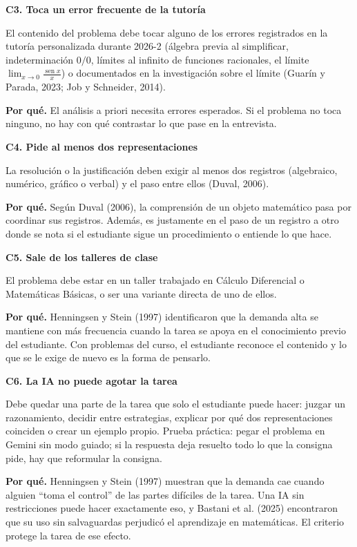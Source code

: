 \documentclass[11pt,letterpaper]{article}
\DeclareMathOperator{\seno}{sen}
\newenvironment{caja}[1]{\par\medskip\noindent\textbf{#1}\par\smallskip\noindent\ignorespaces}{\par\medskip}
\begin{document}
\begin{caja}{C3. Toca un error frecuente de la tutoría}
El contenido del problema debe tocar alguno de los errores registrados en la tutoría personalizada durante 2026-2 (álgebra previa al simplificar, indeterminación $0/0$, límites al infinito de funciones racionales, el límite $\lim_{x\to 0}\frac{\seno x}{x}$) o documentados en la investigación sobre el límite (Guarín y Parada, 2023; Job y Schneider, 2014).

\textbf{Por qué.} El análisis a priori necesita errores esperados. Si el problema no toca ninguno, no hay con qué contrastar lo que pase en la entrevista.
\end{caja}

\begin{caja}{C4. Pide al menos dos representaciones}
La resolución o la justificación deben exigir al menos dos registros (algebraico, numérico, gráfico o verbal) y el paso entre ellos (Duval, 2006).

\textbf{Por qué.} Según Duval (2006), la comprensión de un objeto matemático pasa por coordinar sus registros. Además, es justamente en el paso de un registro a otro donde se nota si el estudiante sigue un procedimiento o entiende lo que hace.
\end{caja}

\begin{caja}{C5. Sale de los talleres de clase}
El problema debe estar en un taller trabajado en Cálculo Diferencial o Matemáticas Básicas, o ser una variante directa de uno de ellos.

\textbf{Por qué.} Henningsen y Stein (1997) identificaron que la demanda alta se mantiene con más frecuencia cuando la tarea se apoya en el conocimiento previo del estudiante. Con problemas del curso, el estudiante reconoce el contenido y lo que se le exige de nuevo es la forma de pensarlo.
\end{caja}

\begin{caja}{C6. La IA no puede agotar la tarea}
Debe quedar una parte de la tarea que solo el estudiante puede hacer: juzgar un razonamiento, decidir entre estrategias, explicar por qué dos representaciones coinciden o crear un ejemplo propio. Prueba práctica: pegar el problema en Gemini sin modo guiado; si la respuesta deja resuelto todo lo que la consigna pide, hay que reformular la consigna.

\textbf{Por qué.} Henningsen y Stein (1997) muestran que la demanda cae cuando alguien ``toma el control'' de las partes difíciles de la tarea. Una IA sin restricciones puede hacer exactamente eso, y Bastani et al. (2025) encontraron que su uso sin salvaguardas perjudicó el aprendizaje en matemáticas. El criterio protege la tarea de ese efecto.
\end{caja}
\end{document}

